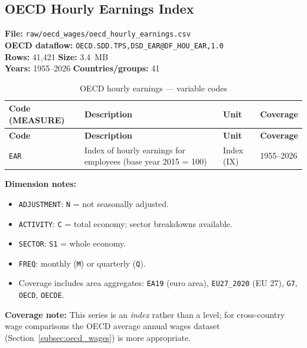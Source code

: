 \documentclass[11pt,a4paper]{article}
\begin{document}
\subsection{OECD Hourly Earnings Index}
\label{subsec:oecd_hourly}

\textbf{File:} \texttt{raw/oecd\_wages/oecd\_hourly\_earnings.csv}\\
\textbf{OECD dataflow:} \texttt{OECD.SDD.TPS,DSD\_EAR@DF\_HOU\_EAR,1.0}\\
\textbf{Rows:} 41{,}421 \quad \textbf{Size:} 3.4~MB\\
\textbf{Years:} 1955--2026 \quad \textbf{Countries/groups:} 41

\begin{longtable}{L{2.4cm} L{6.0cm} C{2.2cm} C{2.5cm}}
    \caption{OECD hourly earnings --- variable codes}
    \label{tab:oecd_hourly}\\
    \toprule
    \textbf{Code (MEASURE)} & \textbf{Description} & \textbf{Unit} & \textbf{Coverage} \\
    \midrule
    \endfirsthead
    \toprule
    \textbf{Code} & \textbf{Description} & \textbf{Unit} & \textbf{Coverage} \\
    \midrule
    \endhead
    \bottomrule
    \endlastfoot
    \texttt{EAR} & Index of hourly earnings for employees (base year 2015 = 100) & Index (IX) & 1955--2026 \\
\end{longtable}

\noindent\textbf{Dimension notes:}
\begin{itemize}[noitemsep]
    \item \texttt{ADJUSTMENT}: \texttt{N} = not seasonally adjusted.
    \item \texttt{ACTIVITY}: \texttt{C} = total economy; sector breakdowns available.
    \item \texttt{SECTOR}: \texttt{S1} = whole economy.
    \item \texttt{FREQ}: monthly (\texttt{M}) or quarterly (\texttt{Q}).
    \item Coverage includes area aggregates: \texttt{EA19} (euro area),
    \texttt{EU27\_2020} (EU 27), \texttt{G7}, \texttt{OECD}, \texttt{OECDE}.
\end{itemize}

\noindent\textbf{Coverage note:} This series is an \emph{index} rather than a level;
for cross-country wage comparisons the OECD average annual wages dataset
(Section~\ref{subsec:oecd_wages}) is more appropriate.
\end{document}
